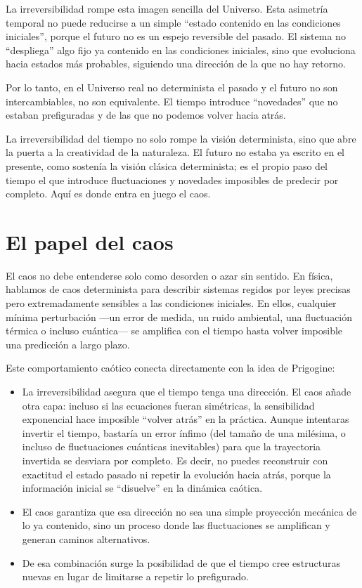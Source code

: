 \documentclass[
  10pt,
  a4paper,
  DIV=11,
  numbers=noendperiod,
  open=any]{scrreprt}
\numberwithin{equation}{chapter}
\numberwithin{equation}{section}
\renewcommand{\[}{\begin{equation}}
\renewcommand{\]}{\end{equation}}
\begin{document}
La irreversibilidad rompe esta imagen sencilla del Universo. Esta
asimetría temporal no puede reducirse a un simple ``estado contenido en
las condiciones iniciales'', porque el futuro no es un espejo reversible
del pasado. El sistema no ``despliega'' algo fijo ya contenido en las
condiciones iniciales, sino que evoluciona hacia estados más probables,
siguiendo una dirección de la que no hay retorno.

Por lo tanto, en el Universo real no determinista el pasado y el futuro
no son intercambiables, no son equivalente. El tiempo introduce
``novedades'' que no estaban prefiguradas y de las que no podemos volver
hacia atrás.

La irreversibilidad del tiempo no solo rompe la visión determinista,
sino que abre la puerta a la creatividad de la naturaleza. El futuro no
estaba ya escrito en el presente, como sostenía la visión clásica
determinista; es el propio paso del tiempo el que introduce
fluctuaciones y novedades imposibles de predecir por completo. Aquí es
donde entra en juego el caos.

\chapter{El papel del caos}\label{el-papel-del-caos}

El caos no debe entenderse solo como desorden o azar sin sentido. En
física, hablamos de caos determinista para describir sistemas regidos
por leyes precisas pero extremadamente sensibles a las condiciones
iniciales. En ellos, cualquier mínima perturbación ---un error de
medida, un ruido ambiental, una fluctuación térmica o incluso
cuántica--- se amplifica con el tiempo hasta volver imposible una
predicción a largo plazo.

Este comportamiento caótico conecta directamente con la idea de
Prigogine:

\begin{itemize}
\item
  La irreversibilidad asegura que el tiempo tenga una dirección. El caos
  añade otra capa: incluso si las ecuaciones fueran simétricas, la
  sensibilidad exponencial hace imposible ``volver atrás'' en la
  práctica. Aunque intentaras invertir el tiempo, bastaría un error
  ínfimo (del tamaño de una milésima, o incluso de fluctuaciones
  cuánticas inevitables) para que la trayectoria invertida se desviara
  por completo. Es decir, no puedes reconstruir con exactitud el estado
  pasado ni repetir la evolución hacia atrás, porque la información
  inicial se ``disuelve'' en la dinámica caótica.
\item
  El caos garantiza que esa dirección no sea una simple proyección
  mecánica de lo ya contenido, sino un proceso donde las fluctuaciones
  se amplifican y generan caminos alternativos.
\item
  De esa combinación surge la posibilidad de que el tiempo cree
  estructuras nuevas en lugar de limitarse a repetir lo prefigurado.
\end{itemize}
\end{document}
